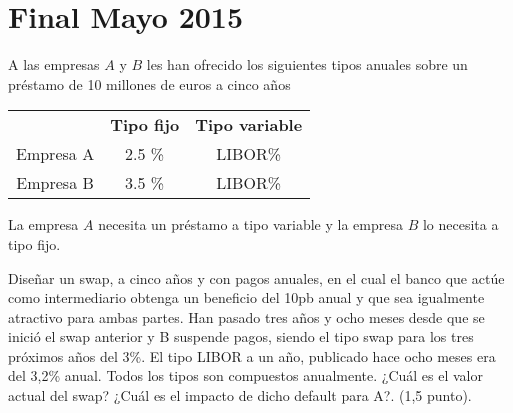 \section{Final Mayo 2015}
\begin{problem}[1]
A las empresas $A$ y $B$ les han ofrecido los siguientes tipos anuales sobre un préstamo de 10 millones de euros a cinco años

\begin{center}
\begin{tabular}{ccc}
\hline
& \textbf{Tipo fijo} & \textbf{Tipo variable} \\
Empresa A & 2.5 \% & LIBOR\% \\
Empresa B & 3.5 \% & LIBOR\% \\
\hline
\end{tabular}
\end{center}

La empresa $A$ necesita un préstamo a tipo variable y la empresa $B$ lo necesita a tipo fijo.

\ppart Diseñar un swap, a cinco años y con pagos anuales, en el cual el banco que actúe como intermediario obtenga un beneficio del 10pb anual y que sea igualmente atractivo para ambas partes.
\ppart Han pasado tres años y ocho meses desde que se inició el swap anterior y B suspende pagos, siendo el tipo swap para los tres próximos años del 3\%. El tipo LIBOR a un año, publicado hace ocho meses era
del 3,2\% anual. Todos los tipos son compuestos anualmente. ¿Cuál es el valor actual del swap? ¿Cuál es el impacto de dicho default para A?. (1,5 punto).
\solution

\end{problem}

